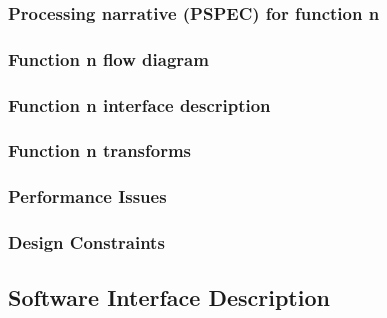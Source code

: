 \documentclass{article}
\begin{document}
\subsubsection{Processing narrative (PSPEC) for function n}

\subsubsection{Function n flow diagram}

\subsubsection{Function n interface description}

\subsubsection{Function n transforms}





\subsubsection{Performance Issues}

\subsubsection{Design Constraints}

\subsection{Software Interface Description}
\end{document}
